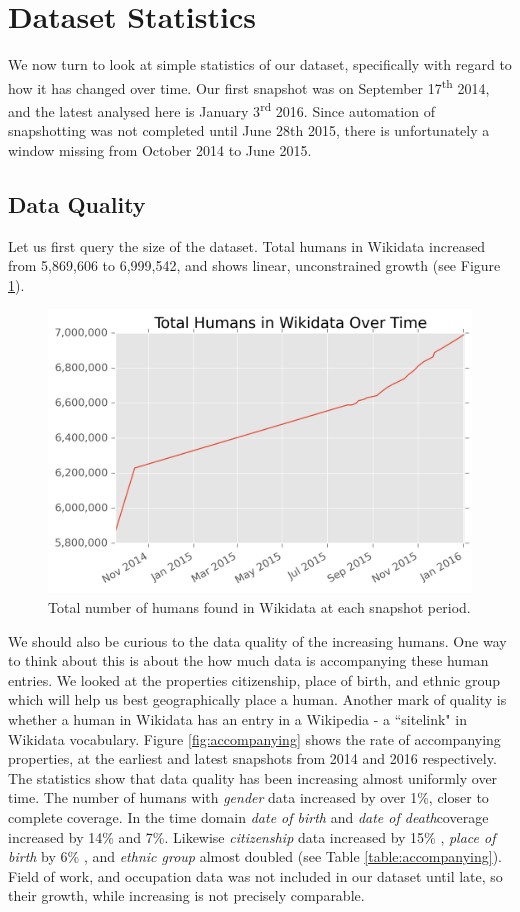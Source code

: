 \documentclass[letterpaper]{article}
\begin{document}
\section{Dataset Statistics}
We now turn to look at simple statistics of our dataset, specifically with regard to how it has changed over time. Our first snapshot was on September 17\textsuperscript{th} 2014, and the latest analysed here is January 3\textsuperscript{rd} 2016. Since automation of snapshotting was not completed until June 28th 2015, there is unfortunately a window missing from October 2014 to June 2015. 

\subsection{Data Quality}
Let us first query the size of the dataset. Total humans in Wikidata increased from 5,869,606 to 6,999,542, and shows linear, unconstrained growth (see Figure \ref{fig:totalhumans}).
\begin{figure}
\label{fig:totalhumans}
\includegraphics[scale=0.6]{figures/totalhumans.png} 
\caption{Total number of humans found in Wikidata at each snapshot period.}
\end{figure}

We should also be curious to the data quality of the increasing humans. One way to think about this is about the how much data is accompanying these human entries. We looked at the properties citizenship, place of birth, and ethnic group which will help us best geographically place a human. Another mark of quality is whether a human in Wikidata has an entry in a Wikipedia - a ``sitelink" in Wikidata vocabulary. Figure \ref{fig:accompanying} shows the rate of accompanying properties, at the earliest and latest snapshots from 2014 and 2016 respectively. The statistics show that data quality has been increasing almost uniformly over time. The number of humans with \textit{gender} data increased by over 1\%, closer to complete coverage. In the time domain \textit{date of birth} and \textit{date of death}coverage increased by 14\% and 7\%. Likewise \textit{citizenship} data increased by 15\% , \textit{place of birth} by 6\% , and \textit{ethnic group} almost doubled (see Table \ref{table:accompanying}). Field of work, and occupation data was not included in our dataset until late, so their growth, while increasing is not precisely comparable.
\end{document}
